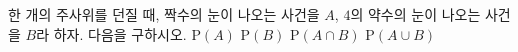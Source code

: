 한 개의 주사위를 던질 때, 짝수의 눈이 나오는 사건을 $A$, $4$의 약수의 눈이 나오는 사건을 $B$라 하자. 다음을 구하시오.
 $\mathrm{P}(A)$
 $\mathrm{P}(B)$
 $\mathrm{P}(A\cap B)$
 $\mathrm{P}(A\cup B)$
